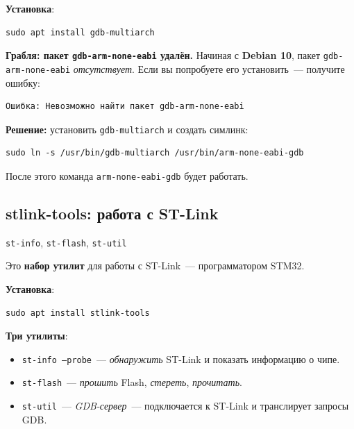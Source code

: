 \textbf{Установка}:

\begin{verbatim}
sudo apt install gdb-multiarch
\end{verbatim}

\begin{warnbox}
\textbf{Грабля: пакет \texttt{gdb-arm-none-eabi} удалён.}
Начиная с \textbf{Debian 10}, пакет \texttt{gdb-arm-none-eabi}
\emph{отсутствует}. Если вы попробуете его установить~---
получите ошибку:
\begin{verbatim}
Ошибка: Невозможно найти пакет gdb-arm-none-eabi
\end{verbatim}
\textbf{Решение:} установить \texttt{gdb-multiarch} и
создать симлинк:
\begin{verbatim}
sudo ln -s /usr/bin/gdb-multiarch /usr/bin/arm-none-eabi-gdb
\end{verbatim}
После этого команда \texttt{arm-none-eabi-gdb} будет работать.
\end{warnbox}

\subsection{stlink-tools: работа с ST-Link}

\begin{center}
\texttt{st-info}, \texttt{st-flash}, \texttt{st-util}
\end{center}

Это \textbf{набор утилит} для работы с ST-Link~---
программатором STM32.

\textbf{Установка}:

\begin{verbatim}
sudo apt install stlink-tools
\end{verbatim}

\textbf{Три утилиты}:

\begin{itemize}
    \item \texttt{st-info --probe}~--- \emph{обнаружить}
          ST-Link и показать информацию о чипе.
    \item \texttt{st-flash}~--- \emph{прошить} Flash,
          \emph{стереть}, \emph{прочитать}.
    \item \texttt{st-util}~--- \emph{GDB-сервер}~---
          подключается к ST-Link и транслирует запросы GDB.
\end{itemize}

